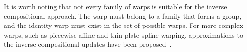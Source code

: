 It is worth noting that not every family of warps is suitable for the inverse
compositional approach. The warp must belong to a family that forms a group, and
the identity warp must exist in the set of possible warps. For more complex
warps, such as piecewise affine and thin plate spline warping, approximations to
the inverse compositional updates have been
proposed~\cite{RefWorks:227,RefWorks:277}.


